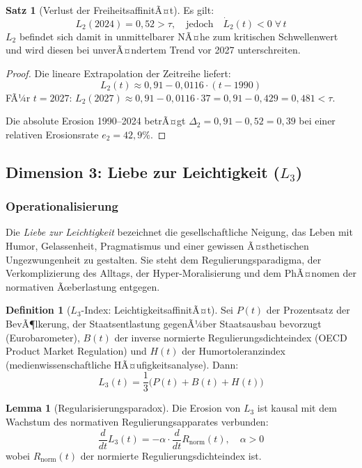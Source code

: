 ﻿\documentclass[a4paper,12pt]{article}
\theoremstyle{definition}
\newtheorem{definition}{Definition}
\newtheorem{satz}{Satz}
\newtheorem{lemma}{Lemma}
\begin{document}
\begin{satz}[Verlust der FreiheitsaffinitÃ¤t]
\label{satz:l2verlust}
Es gilt:
\[
L_2(2024) = 0{,}52 > \tau, \quad \text{jedoch} \quad \dot{L}_2(t) < 0 \;\forall\, t
\]
$L_2$ befindet sich damit in unmittelbarer NÃ¤he zum kritischen Schwellenwert und wird diesen bei unverÃ¤ndertem Trend vor 2027 unterschreiten.
\end{satz}

\begin{proof}
Die lineare Extrapolation der Zeitreihe liefert:
\[
L_2(t) \approx 0{,}91 - 0{,}0116 \cdot (t - 1990)
\]
FÃ¼r $t = 2027$: $L_2(2027) \approx 0{,}91 - 0{,}0116 \cdot 37 = 0{,}91 - 0{,}429 = 0{,}481 < \tau$.

Die absolute Erosion 1990--2024 betrÃ¤gt $\Delta_2 = 0{,}91 - 0{,}52 = 0{,}39$ bei einer relativen Erosionsrate $e_2 = 42{,}9\%$. \qedhere
\end{proof}

\subsection{Dimension 3: Liebe zur Leichtigkeit ($L_3$)}

\subsubsection{Operationalisierung}

Die \emph{Liebe zur Leichtigkeit} bezeichnet die gesellschaftliche Neigung, das Leben mit Humor, Gelassenheit, Pragmatismus und einer gewissen Ã¤sthetischen Ungezwungenheit zu gestalten. Sie steht dem Regulierungsparadigma, der Verkomplizierung des Alltags, der Hyper-Moralisierung und dem PhÃ¤nomen der normativen Ãœberlastung entgegen.

\begin{definition}[$L_3$-Index: LeichtigkeitsaffinitÃ¤t]
Sei $P(t)$ der Prozentsatz der BevÃ¶lkerung, der Staatsentlastung gegenÃ¼ber Staatsausbau bevorzugt (Eurobarometer), $B(t)$ der inverse normierte Regulierungsdichteindex (OECD Product Market Regulation) und $H(t)$ der Humortoleranzindex (medienwissenschaftliche HÃ¤ufigkeitsanalyse). Dann:
\[
L_3(t) = \frac{1}{3}\bigl(P(t) + B(t) + H(t)\bigr)
\]
\end{definition}

\begin{lemma}[Regularisierungsparadox]
\label{lem:regulierung}
Die Erosion von $L_3$ ist kausal mit dem Wachstum des normativen Regulierungsapparates verbunden:
\[
\frac{d}{dt}L_3(t) = -\alpha \cdot \frac{d}{dt}R_{\text{norm}}(t), \quad \alpha > 0
\]
wobei $R_{\text{norm}}(t)$ der normierte Regulierungsdichteindex ist.
\end{lemma}
\end{document}
